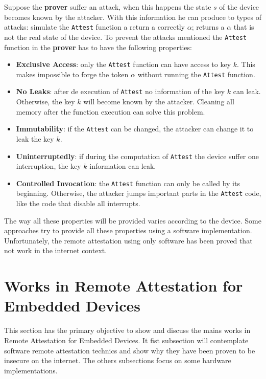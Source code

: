 
Suppose the \textbf{prover}  suffer an attack, when this happens the state $s$ of the device becomes known by the attacker. With this information he can produce to types of attacks: simulate the \verb|Attest| function a return a correctly $\alpha$; returns a $\alpha$ that is not the real state of the device. To prevent the  attacks mentioned the \verb|Attest| function in the  \textbf{prover} has to have the following properties:

\begin{itemize}
	\item \textbf{Exclusive Access}: only the \verb|Attest| function can have access to key $k$. This makes impossible to forge the token $\alpha$ without running the \verb|Attest|  function. 
	\item \textbf{No Leaks}: after de execution of \verb|Attest| no information of the key $k$ can leak. Otherwise, the key $k$ will become known by the attacker. Cleaning all memory after the function execution can solve this problem.
	\item \textbf{Immutability}: if the \verb|Attest|  can be changed, the attacker can change it to leak the key $k$. 
	\item \textbf{Uninterruptedly}: if during the computation of \verb |Attest| the device suffer one interruption, the key $k$ information can leak.
	\item \textbf{Controlled Invocation}: the  \verb|Attest|  function can only be called by its beginning. Otherwise, the attacker jumps important parts in the \verb|Attest|  code, like the code that disable all interrupts. 
\end{itemize}

The way all these properties will be provided varies according to the device.  Some approaches try to provide all these properties using a software implementation. Unfortunately, the remote attestation using only software has been proved that not work in the internet context.

\section{Works in Remote Attestation for Embedded Devices}

This section has the primary objective to show and discuss the mains works in Remote Attestation for Embedded Devices. It fist subsection will contemplate software remote attestation technics and show why they have been proven to be insecure on the internet. The others subsections focus on some hardware implementations. 

